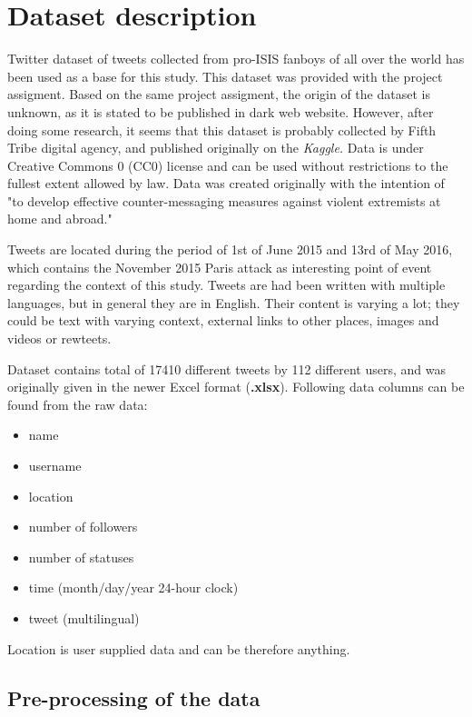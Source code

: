 \documentclass[conference]{IEEEtran}
\begin{document}
    \section{Dataset description}\label{sec:dataset-description}

    Twitter dataset of tweets collected from pro-ISIS fanboys of all over the world has been used as a base for this study.
    This dataset was provided with the project assigment.
    Based on the same project assigment, the origin of the dataset is unknown, as it is stated to be published in dark web website.
    However, after doing some research, it seems that this dataset is probably collected by Fifth Tribe digital agency, and published originally on the \textit{Kaggle.}\cite{dataKaggleOrigin}
    Data is under Creative Commons 0 (CC0) license and can be used without restrictions to the fullest extent allowed by law.
    Data was created originally with the intention of "to develop effective counter-messaging measures against violent extremists at home and abroad."\cite{dataKaggleOrigin}

    Tweets are located during the period of 1st of June 2015 and 13rd of May 2016, which contains the November 2015 Paris attack as interesting
    point of event regarding the context of this study.
    Tweets are had been written with multiple languages, but in general they are in English.
    Their content is varying a lot; they could be text with varying context, external links to other places, images and videos or rewteets.

    Dataset contains total of 17410 different tweets by 112 different users, and was originally given in the newer Excel format (\textbf{.xlsx}).
    Following data columns can be found from the raw data:

    \begin{itemize}
        \item name
        \item username
        \item location
        \item number of followers
        \item number of statuses
        \item time (month/day/year 24-hour clock)
        \item tweet (multilingual)
    \end{itemize}

    Location is user supplied data and can be therefore anything.

    \subsection{Pre-processing of the data}\label{subsec:pre-processing-of-the-data}
\end{document}
